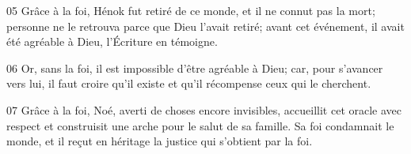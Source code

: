 
05 Grâce à la foi, Hénok fut retiré de ce monde, et il ne connut pas la mort; personne ne le retrouva parce que Dieu l’avait retiré; avant cet événement, il avait été agréable à Dieu, l’Écriture en témoigne.

06 Or, sans la foi, il est impossible d’être agréable à Dieu; car, pour s’avancer vers lui, il faut croire qu’il existe et qu’il récompense ceux qui le cherchent.

07 Grâce à la foi, Noé, averti de choses encore invisibles, accueillit cet oracle avec respect et construisit une arche pour le salut de sa famille. Sa foi condamnait le monde, et il reçut en héritage la justice qui s’obtient par la foi.

